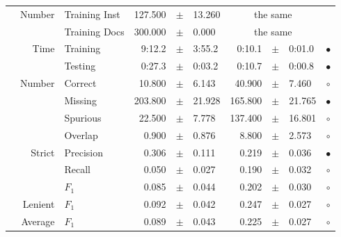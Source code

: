 \begin{longtable}{|r|r|l||rcl|rcl|c|}
\cline{2-10} & \multirow{2}{*}{    Number} &   Training Inst &     127.500 &  $\pm$  &      13.260 &    \multicolumn{3}{c|}{the same}         &  \\
\cline{3-10} &                             &   Training Docs &     300.000 &  $\pm$  &       0.000 &    \multicolumn{3}{c|}{the same}         &  \\
\cline{2-10} & \multirow{2}{*}{      Time} &        Training &      9:12.2 &  $\pm$  &      3:55.2 &      0:10.1 &  $\pm$  &      0:01.0 & $\bullet$ \\
\cline{3-10} &                             &         Testing &      0:27.3 &  $\pm$  &      0:03.2 &      0:10.7 &  $\pm$  &      0:00.8 & $\bullet$ \\
\hline
\pagebreak
\hline
\hline
\multirow{11}{*}{\begin{sideways}sellerabr\end{sideways} }
             & \multirow{4}{*}{    Number} &         Correct &      10.800 &  $\pm$  &       6.143 &      40.900 &  $\pm$  &       7.460 & $\circ$ \\
\cline{3-10} &                             &         Missing &     203.800 &  $\pm$  &      21.928 &     165.800 &  $\pm$  &      21.765 & $\bullet$ \\
\cline{3-10} &                             &        Spurious &      22.500 &  $\pm$  &       7.778 &     137.400 &  $\pm$  &      16.801 & $\circ$ \\
\cline{3-10} &                             &         Overlap &       0.900 &  $\pm$  &       0.876 &       8.800 &  $\pm$  &       2.573 & $\circ$ \\
\cline{2-10} & \multirow{3}{*}{    Strict} &       Precision &       0.306 &  $\pm$  &       0.111 &       0.219 &  $\pm$  &       0.036 & $\bullet$ \\
\cline{3-10} &                             &          Recall &       0.050 &  $\pm$  &       0.027 &       0.190 &  $\pm$  &       0.032 & $\circ$ \\
\cline{3-10} &                             &           $F_1$ &       0.085 &  $\pm$  &       0.044 &       0.202 &  $\pm$  &       0.030 & $\circ$ \\
\cline{2-10} &                     Lenient &           $F_1$ &       0.092 &  $\pm$  &       0.042 &       0.247 &  $\pm$  &       0.027 & $\circ$ \\
\cline{2-10} &                     Average &           $F_1$ &       0.089 &  $\pm$  &       0.043 &       0.225 &  $\pm$  &       0.027 & $\circ$ \\

\end{longtable}
